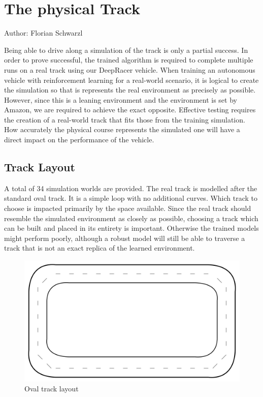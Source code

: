 \chapter{The physical Track}
Author: Florian Schwarzl

Being able to drive along a simulation of the track is only a partial success. In order to prove successful, the trained algorithm is required to complete multiple runs on a real track using our DeepRacer vehicle. When training an autonomous vehicle with reinforcement learning for a real-world scenario, it is logical to create the simulation so that is represents the real environment as precisely as possible. However, since this is a leaning environment and the environment is set by Amazon, we are required to achieve the exact opposite. Effective testing requires the creation of a real-world track that fits those from the training simulation. How accurately the physical course represents the simulated one will have a direct impact on the performance of the vehicle.

\section{Track Layout}
A total of 34 simulation worlds are provided. The real track is modelled after the standard oval track. It is a simple loop with no additional curves. Which track to choose is impacted primarily by the space available. Since the real track should resemble the simulated environment as closely as possible, choosing a track which can be built and placed in its entirety is important. Otherwise the trained models might perform poorly, although a robust model will still be able to traverse a track that is not an exact replica of the learned environment. 
\begin{figure}
    \centering
    \includegraphics[width=.85\textwidth]{images/oval_track.png}
    \caption{Oval track layout}
    \label{fig:track}
\end{figure}


